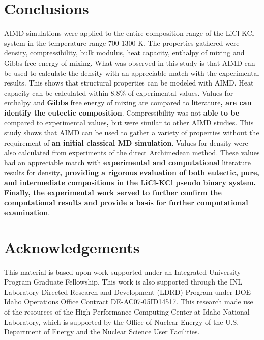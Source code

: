 \documentclass[review]{elsarticle}
\providecommand{\DIFaddtex}[1]{{\bf #1}} %
\providecommand{\DIFdeltex}[1]{} %
\providecommand{\DIFaddbegin}{\protect\color{blue}} %
\providecommand{\DIFaddend}{\protect\color{black}} %
\providecommand{\DIFdelbegin}{\protect\color{red}} %
\providecommand{\DIFdelend}{\protect\color{black}} %
\providecommand{\DIFadd}[1]{\texorpdfstring{\DIFaddtex{#1}}{#1}} %
\providecommand{\DIFdel}[1]{\texorpdfstring{\DIFdeltex{#1}}{}} %
\newcommand{\DIFscaledelfig}{0.5}
\newlength{\DIFdelgraphicswidth} %
\newlength{\DIFdelgraphicsheight} %
\newcommand{\DIFaddincludegraphics}[2][]{{\color{blue}\fbox{\DIFOincludegraphics[#1]{#2}}}} %
\newcommand{\DIFdelincludegraphics}[2][]{%
\sbox{\DIFdelgraphicsbox}{\DIFOincludegraphics[#1]{#2}}%
\settoboxwidth{\DIFdelgraphicswidth}{\DIFdelgraphicsbox} %
\settoboxtotalheight{\DIFdelgraphicsheight}{\DIFdelgraphicsbox} %
\scalebox{\DIFscaledelfig}{%
\parbox[b]{\DIFdelgraphicswidth}{\usebox{\DIFdelgraphicsbox}\\[-\baselineskip] \rule{\DIFdelgraphicswidth}{0em}}\llap{\resizebox{\DIFdelgraphicswidth}{\DIFdelgraphicsheight}{%
\setlength{\unitlength}{\DIFdelgraphicswidth}%
\begin{picture}(1,1)%
\thicklines\linethickness{2pt} %
{\color[rgb]{1,0,0}\put(0,0){\framebox(1,1){}}}%
{\color[rgb]{1,0,0}\put(0,0){\line( 1,1){1}}}%
{\color[rgb]{1,0,0}\put(0,1){\line(1,-1){1}}}%
\end{picture}%
}\hspace*{3pt}}} %
} %
\DeclareRobustCommand{\DIFaddbegin}{\DIFOaddbegin \let\includegraphics\DIFaddincludegraphics} %
\DeclareRobustCommand{\DIFaddend}{\DIFOaddend \let\includegraphics\DIFOincludegraphics} %
\DeclareRobustCommand{\DIFdelbegin}{\DIFOdelbegin \let\includegraphics\DIFdelincludegraphics} %
\DeclareRobustCommand{\DIFdelend}{\DIFOaddend \let\includegraphics\DIFOincludegraphics} %
\begin{document}
\section{Conclusions}

AIMD simulations were applied to the entire composition range of the LiCl-KCl system in the temperature range 700-1300 K. The properties gathered were density, compressibility, bulk modulus, heat capacity, enthalpy of mixing and Gibbs free energy of mixing. What was observed in this study is that AIMD can be used to calculate the density with an appreciable match with the experimental results. This shows that structural properties can be modeled with AIMD. Heat capacity can be calculated within 8.8\% of experimental values. Values for enthalpy and \DIFdelbegin \DIFdel{Gibb's }\DIFdelend \DIFaddbegin \DIFadd{Gibbs }\DIFaddend free energy of mixing are compared to literature\DIFaddbegin \DIFadd{, are can identify the eutectic composition}\DIFaddend . Compressibility was not \DIFaddbegin \DIFadd{able to be }\DIFaddend compared to experimental values\DIFaddbegin \DIFadd{, }\DIFaddend but were similar to other AIMD studies. This study shows that AIMD can be used to gather a variety of properties without the requirement of \DIFdelbegin \DIFdel{starting from a classical MD run}\DIFdelend \DIFaddbegin \DIFadd{an initial classical MD simulation}\DIFaddend . Values for density were also calculated from experiments of the direct Archimedean method. These values had an appreciable match with \DIFaddbegin \DIFadd{experimental and computational }\DIFaddend literature results for density\DIFaddbegin \DIFadd{, providing a rigorous evaluation of both eutectic, pure, and intermediate compositions in the LiCl-KCl pseudo binary system. Finally, the experimental work served to further confirm the computational results and provide a basis for further computational examination}\DIFaddend .


\section{Acknowledgements}

This material is based upon work supported under an Integrated University Program Graduate Fellowship. This work is also supported through the INL Laboratory Directed Research and Development (LDRD) Program under DOE Idaho Operations Office Contract DE-AC07-05ID14517. This research made use of the resources of the High-Performance Computing Center at Idaho National Laboratory, which is supported by the Office of Nuclear Energy of the U.S. Department of Energy and the Nuclear Science User Facilities.    


\end{document}
